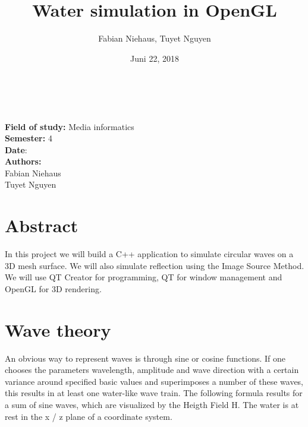 ﻿\documentclass[12pt,a4paper]{scrartcl}
\title{Water simulation in OpenGL}
\author{Fabian Niehaus, Tuyet Nguyen}
\date{Juni 22, 2018}
\begin{document}
\begin{titlepage}
	\centering
	\ \\[2cm]
	{\huge\textbf{\@title}} 
	\\[3cm]
	\large
	\textbf{Field of study:} Media informatics \\
	\textbf{Semester:} 4
	\\[2cm]
	\textbf{Date}: \@date
	\\[2cm]
	\textbf {Authors:}
	\\Fabian Niehaus
	\\Tuyet Nguyen
\end{titlepage}

\newpage
\setcounter{page}{0}
\tableofcontents
\newpage
\listoffigures

\newpage
\ofoot[]{\pagemark}
\normalsize

\section{Abstract}
In this project we will build a C++ application to simulate circular waves on a 3D mesh surface. We will also simulate reflection using the Image Source Method. We will use QT Creator for programming, QT for window management and OpenGL for 3D rendering.

\section{Wave theory}\label{wave-theory}
An obvious way to represent waves is through sine or cosine functions. If one chooses the parameters wavelength, amplitude and wave direction with a certain variance around specified basic values and superimposes a number of these waves, this results in at least one water-like wave train. The following formula results for a sum of sine waves, which are visualized by the Heigth Field H. The water is at rest in the x / z plane of a coordinate system.\\
\end{document}
